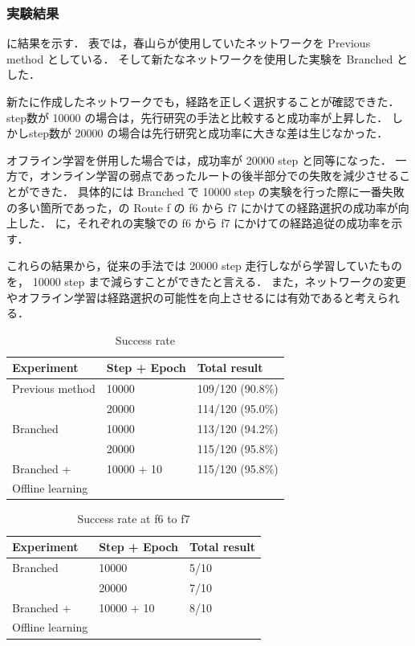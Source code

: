 \clearpage
\subsubsection{実験結果}
に結果を示す．
表では，春山らが使用していたネットワークを Previous method としている．
そして新たなネットワークを使用した実験を Branched とした．

新たに作成したネットワークでも，経路を正しく選択することが確認できた．
step数が 10000 の場合は，先行研究の手法と比較すると成功率が上昇した．
しかしstep数が 20000 の場合は先行研究と成功率に大きな差は生じなかった．

オフライン学習を併用した場合では，成功率が 20000 step と同等になった．
一方で，オンライン学習の弱点であったルートの後半部分での失敗を減少させることができた．
具体的には Branched で 10000 step の実験を行った際に一番失敗の多い箇所であった，の Route f の f6 から f7 にかけての経路選択の成功率が向上した．
に，それぞれの実験での f6 から f7 にかけての経路追従の成功率を示す．

これらの結果から，従来の手法では 20000 step 走行しながら学習していたものを， 10000 step まで減らすことができたと言える．
また，ネットワークの変更やオフライン学習は経路選択の可能性を向上させるには有効であると考えられる．

\begin{table}[]
  \centering
  \caption{Success rate}
  \begin{tabular}{lll}
  \hline
  Experiment         & Step + Epoch & Total result     \\ \hline
  Previous method    & 10000        & 109/120 (90.8\%) \\
                     & 20000        & 114/120 (95.0\%) \\ \hline
  Branched           & 10000        & 113/120 (94.2\%) \\ 
                     & 20000        & 115/120 (95.8\%) \\ \hline
  Branched +         & 10000 + 10   & 115/120 (95.8\%) \\ 
  Offline learning   &              &                  \\ \hline
  \end{tabular}
  \label{tab:result}
\end{table}

\begin{table}[]
  \centering
  \caption{Success rate at f6 to f7}
  \begin{tabular}{lll}
  \hline
  Experiment         & Step + Epoch & Total result \\ \hline
  Branched           & 10000        & 5/10         \\ 
                     & 20000        & 7/10         \\ \hline
  Branched +         & 10000 + 10   & 8/10         \\ 
  Offline learning   &              &              \\ \hline
  \end{tabular}
  \label{tab:f_result}
\end{table}